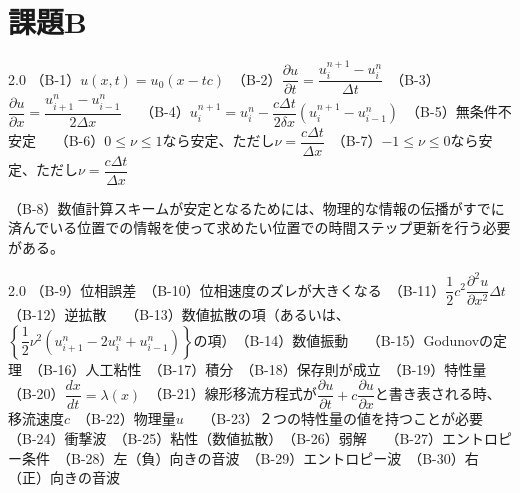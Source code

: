 \documentclass[ja=standard,xelatex]{bxjsarticle}
\newcommand{\vs}[1]{\vskip#1\baselineskip}
\newcommand{\dif}[2]{\dfrac{d#1}{d#2}}
\newcommand{\pdif}[2]{\dfrac{\partial{#1}}{\partial#2}}
\newcommand{\pdiftwice}[2]{\dfrac{\partial^{2}{#1}}{\partial {#2} ^{2}}}
\newcommand{\bracketnormal}[1]{\left(#1\right)}
\newcommand{\curlybracket}[1]{\left\{#1\right\}}
\begin{document}
\section{課題B}
\begin{spacing}{2.0}
（B-1）$u\bracketnormal{x,t} = u_0\bracketnormal{x-tc}$　（B-2）$\pdif{u}{t} = \dfrac{u_i^{n+1}-u_i^n}{\Delta t}$　（B-3）$\pdif{u}{x}=\dfrac{u_{i+1}^n-u_{i-1}^n}{2\Delta x}$　
\vs{0}
（B-4）$u_i^{n+1} = u_i^n - \dfrac{c\Delta t}{2\delta x}\bracketnormal{u_i^{n+1}-u_{i-1}^n} $　（B-5）無条件不安定　
\vs{0}（B-6）$0\leq \nu \leq 1$なら安定、ただし$\nu = \dfrac{c\Delta t}{\Delta x}$　（B-7）$-1\leq \nu \leq 0$なら安定、ただし$\nu = \dfrac{c\Delta t}{\Delta x}$　
\vs{0}
\end{spacing}
（B-8）数値計算スキームが安定となるためには、物理的な情報の伝播がすでに済んでいる位置での情報を使って求めたい位置での時間ステップ更新を行う必要がある。
\begin{spacing}{2.0}
（B-9）位相誤差　（B-10）位相速度のズレが大きくなる　（B-11）$\dfrac{1}{2}c^2 \pdiftwice{u}{x}\Delta t$　（B-12）逆拡散　
\vs{0}
（B-13）数値拡散の項（あるいは、$\curlybracket{\dfrac{1}{2}\nu ^2\bracketnormal{u_{i+1}^n - 2u_{i}^n+u_{i-1}^n}}$の項）　（B-14）数値振動　
\vs{0}
（B-15）Godunovの定理　（B-16）人工粘性　（B-17）積分　（B-18）保存則が成立　（B-19）特性量　
\vs{0}
（B-20）$\dif{x}{t}=\lambda\bracketnormal{x}$　（B-21）線形移流方程式が$\pdif{u}{t}+c\pdif{u}{x}$と書き表される時、移流速度$c$　（B-22）物理量$u$　
\vs{0}
（B-23）２つの特性量の値を持つことが必要　（B-24）衝撃波　（B-25）粘性（数値拡散）　（B-26）弱解　
\vs{0}
（B-27）エントロピー条件　（B-28）左（負）向きの音波　（B-29）エントロピー波　（B-30）右（正）向きの音波
\end{spacing}

\newpage
\end{document}
